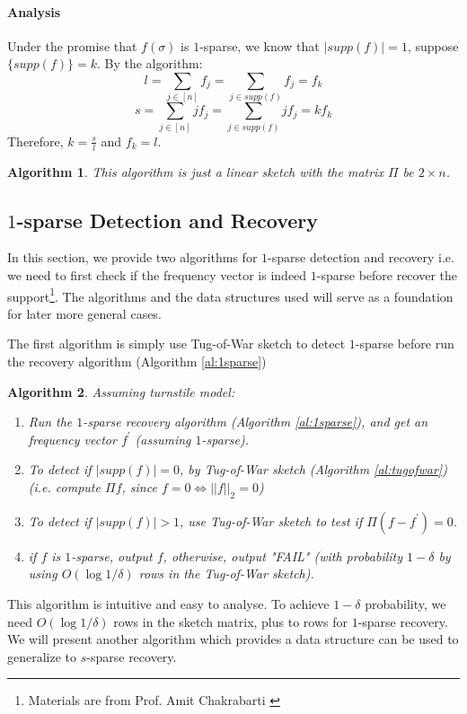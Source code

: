 \documentclass[11pt]{article}
\theoremstyle{plain}
\newtheorem{algorithm}{Algorithm}[section]
\begin{document}
\paragraph{Analysis}  Under the promise that $f(\sigma)$ is 
$1$-sparse, we know that $|supp(f)|=1$, suppose $\{supp(f)\}=k$. By the 
algorithm:
 \[
 l=\sum_{j\in [n]} f_j =\sum_{j\in supp(f)} f_j=f_k
\]
 \[
s=\sum_{j\in [n]} jf_j =\sum_{j\in supp(f)} jf_j=kf_k
\]
Therefore, $k=\frac{s}{l}$ and $f_k=l$.

\begin{algorithm}
This algorithm is just a linear sketch with the matrix $\Pi$ be $2\times n$.
\end{algorithm}


\subsection{$1$-sparse Detection and Recovery}
In this section, we provide two algorithms for 
$1$-sparse detection and recovery i.e. we need to first check if the frequency 
vector is indeed $1$-sparse before recover the support\footnote{Materials are 
from Prof. Amit Chakrabarti  \cite{Cha2015-notes}}. The algorithms and the data 
structures used will serve as a foundation for later more general cases. 

The first algorithm is simply use Tug-of-War sketch to detect $1$-sparse 
before run the recovery algorithm (Algorithm \ref{al:1sparse})

\begin{algorithm}
\label{al:1sparsedetection-naive}
Assuming turnstile model:
\begin{enumerate}
	\item Run the $1$-sparse recovery algorithm (Algorithm \ref{al:1sparse}), and 
	get an frequency vector $f^{\prime}$ (assuming $1$-sparse). 
	\item To detect if $|supp(f)|=0$, by Tug-of-War sketch (Algorithm 
	\ref{al:tugofwar}) (i.e. compute $\Pi f$, since $f=0\iff||f||_2=0$)
	\item To detect if $|supp(f)|>1$, use Tug-of-War sketch to test if $\Pi 
	(f-f^{\prime})=0$. 
	\item if $f$ is $1$-sparse, output $f$, otherwise, output "FAIL" (with 
	probability $1-\delta$ by using $O(\log 1/\delta)$ rows in the Tug-of-War 
	sketch).
\end{enumerate}
\end{algorithm}

This algorithm is intuitive and easy to analyse. To achieve $1-\delta$ 
probability, we need $O(\log 1/\delta)$ rows in the sketch matrix, plus to rows 
for $1$-sparse recovery. We will present another algorithm which provides a 
data structure can be used to generalize to $s$-sparse recovery.
\end{document}
